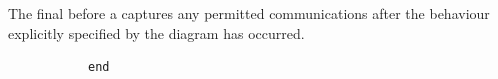 \begin{remark}
The final \msequencegap{} before a \mfinalaction{} captures
any permitted communications after the behaviour explicitly specified by the
diagram has occurred.
\end{remark}

\begin{figure}[h!]

\begin{subfigure}[t]{\egtextwidth}
\begin{lstlisting}[style=Example]
end
\end{lstlisting}
\end{subfigure}
\hfill
\begin{subfigure}[t]{\eggraphicalwidth}
\gsecaption
\centering
{}
\end{subfigure}

\end{figure}

